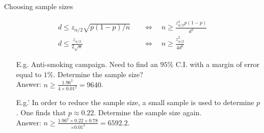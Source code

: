 \begin{frame}{Choosing sample sizes}

 \begin{align}
   d \le  z_{\alpha/2} \sqrt{p(1-p)/n} &\quad\Longleftrightarrow\quad n \ge \frac{z_{\alpha/2}^2p(1-p)}{d^2} \tag{When $p$ is known} \\[1em]
 d \le \frac{z_{\alpha/2}}{2\sqrt{n}} &\quad\Longleftrightarrow\quad n \ge \frac{z_{\alpha/2}^2}{4d^2} \tag{When $p$ is unknown}
 \end{align}
\vfill
\begin{enumerate}
 \item[E.g. ]  Anti-smoking campaign. Need to find an $95\%$ C.I.  with a margin of error equal to $1\%$. Determine the sample size? \\[1em]
 Answer: $n\ge \frac{1.96^2}{4\times 0.01^2} = 9640$.
 \vfill
 \item[E.g.'] In order to reduce the sample size, a small sample is used to determine $p$. One finds that $p\approx 0.22$. Determine the sample size again. \\[1em]
 Answer: $n\ge \frac{1.96^2 \times 0.22\times 0.78}{\times 0.01^2} = 6592.2$.
\end{enumerate}
\end{frame}
